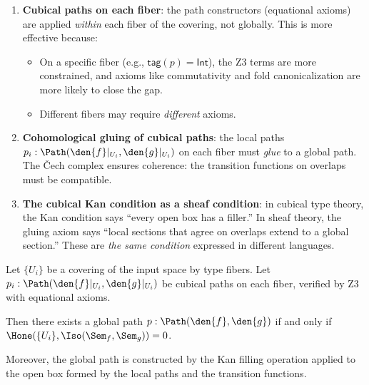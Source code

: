 \begin{enumerate}
  \item \textbf{Cubical paths on each fiber}: the path constructors
    (equational axioms) are applied \emph{within} each fiber of the
    covering, not globally.  This is more effective because:
    \begin{itemize}
      \item On a specific fiber (e.g., $\mathsf{tag}(p) = \mathsf{Int}$),
        the Z3 terms are more constrained, and axioms like commutativity
        and fold canonicalization are more likely to close the gap.
      \item Different fibers may require \emph{different} axioms.
    \end{itemize}

  \item \textbf{Cohomological gluing of cubical paths}: the local paths
    $p_i : \Path(\den{f}|_{U_i}, \den{g}|_{U_i})$ on each fiber must
    \emph{glue} to a global path.  The \v{C}ech complex ensures
    coherence: the transition functions on overlaps must be compatible.

  \item \textbf{The cubical Kan condition as a sheaf condition}: in
    cubical type theory, the Kan condition says ``every open box has a
    filler.''  In sheaf theory, the gluing axiom says ``local sections
    that agree on overlaps extend to a global section.''  These are
    \emph{the same condition} expressed in different languages.
\end{enumerate}

\begin{theorem}
\label{thm:synthesis}
Let $\{U_i\}$ be a covering of the input space by type fibers.
Let $p_i : \Path(\den{f}|_{U_i}, \den{g}|_{U_i})$ be cubical paths
on each fiber, verified by Z3 with equational axioms.

Then there exists a global path $p : \Path(\den{f}, \den{g})$
if and only if $\Hone(\{U_i\}, \Iso(\Sem_f, \Sem_g)) = 0$.

Moreover, the global path is constructed by the Kan filling operation
applied to the open box formed by the local paths and the transition
functions.
\end{theorem}

